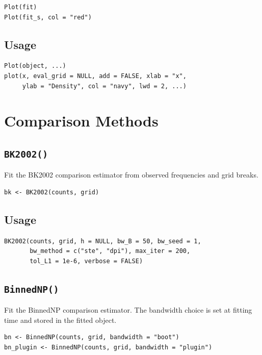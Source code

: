 \documentclass[11pt]{article}
\begin{document}
\begin{lstlisting}
Plot(fit)
Plot(fit_s, col = "red")
\end{lstlisting}

\subsection*{Usage}

\begin{lstlisting}
Plot(object, ...)
plot(x, eval_grid = NULL, add = FALSE, xlab = "x",
     ylab = "Density", col = "navy", lwd = 2, ...)
\end{lstlisting}

\section{Comparison Methods}

\subsection{\texttt{BK2002()}}

Fit the BK2002 comparison estimator from observed frequencies and grid breaks.

\begin{lstlisting}
bk <- BK2002(counts, grid)
\end{lstlisting}

\subsection*{Usage}

\begin{lstlisting}
BK2002(counts, grid, h = NULL, bw_B = 50, bw_seed = 1,
       bw_method = c("ste", "dpi"), max_iter = 200,
       tol_L1 = 1e-6, verbose = FALSE)
\end{lstlisting}

\subsection{\texttt{BinnedNP()}}

Fit the BinnedNP comparison estimator. The bandwidth choice is set at fitting
time and stored in the fitted object.

\begin{lstlisting}
bn <- BinnedNP(counts, grid, bandwidth = "boot")
bn_plugin <- BinnedNP(counts, grid, bandwidth = "plugin")
\end{lstlisting}
\end{document}
